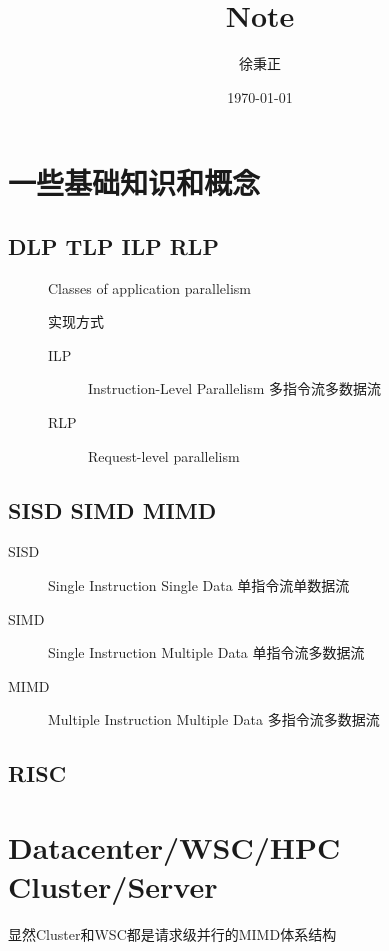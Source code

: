 \documentclass[UTF8]{ctexart}
\title{Note}
\author{徐秉正}
\date{\today}
\begin{document}
\maketitle
\tableofcontents
\section{一些基础知识和概念}
\subsection{DLP TLP ILP RLP}
\begin{description}
    \item[]Classes of application parallelism
    \item[]实现方式
    \begin{description}
    \item[ILP]Instruction-Level Parallelism 多指令流多数据流
    \item[RLP]Request-level parallelism 
    \end{description}
\end{description}
\subsection{SISD SIMD MIMD}
\begin{description}
    \item[SISD]Single Instruction Single Data 单指令流单数据流
    \item[SIMD]Single Instruction Multiple Data 单指令流多数据流
    \item[MIMD]Multiple Instruction Multiple Data 多指令流多数据流
\end{description}
\subsection{RISC}
\section{Datacenter/WSC/HPC Cluster/Server}
显然Cluster和WSC都是请求级并行的MIMD体系结构
\end{document}
